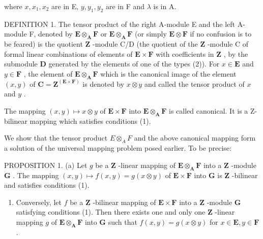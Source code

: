 where \(x, x_{1}, x_{2}\) are in E, \(y, y_{1}, y_{2}\) are in F and \(\lambda\) is in A.

DEFINITION 1. The tensor product of the right A-module E and the left A-module F, denoted by \(\mathbf{E} \otimes_{\mathbf{A}} \mathbf{F}\) or \(\mathbf{E} \otimes_{\mathbf{A}} \mathbf{F}\) (or simply \(\mathbf{E} \otimes \mathbf{F}\) if no confusion is to be feared) is the quotient \(\mathbf{Z}\) -module C/D (the quotient of the \(\mathbf{Z}\) -module C of formal linear combinations of elements of \(\mathbf{E} \times \mathbf{F}\) with coefficients in \(\mathbf{Z}\) , by the submodule \(\mathbf{D}\) generated by the elements of one of the types (2)). For \(x \in \mathbf{E}\) and \(y \in \mathbf{F}\) , the element of \(\mathbf{E} \otimes_{\mathbf{A}} \mathbf{F}\) which is the canonical image of the element \((x, y)\) of \(\mathbf{C} = \mathbf{Z}^{(\mathbf{E} \times \mathbf{F})}\) is denoted by \(x \otimes y\) and called the tensor product of \(x\) and \(y\) .

The mapping \((x,y)\mapsto x\otimes y\) of \(\mathbf{E}\times \mathbf{F}\) into \(\mathbf{E}\otimes_{\mathbf{A}}\mathbf{F}\) is called canonical. It is a Z-bilinear mapping which satisfies conditions (1).

We show that the tensor product \(E \otimes_{A} F\) and the above canonical mapping form a solution of the universal mapping problem posed earlier. To be precise:

PROPOSITION 1. (a) Let \(g\) be a \(\mathbf{Z}\) -linear mapping of \(\mathbf{E} \otimes_{\mathbf{A}} \mathbf{F}\) into a \(\mathbf{Z}\) -module \(\mathbf{G}\) . The mapping \((x, y) \mapsto f(x, y) = g(x \otimes y)\) of \(\mathbf{E} \times \mathbf{F}\) into \(\mathbf{G}\) is \(\mathbf{Z}\) -bilinear and satisfies conditions (1).

\begin{enumerate}
\def\labelenumi{(\alph{enumi})}
\setcounter{enumi}{1}
\tightlist
\item
  Conversely, let \(f\) be a \(\mathbf{Z}\) -bilinear mapping of \(\mathbf{E} \times \mathbf{F}\) into a \(\mathbf{Z}\) -module \(\mathbf{G}\) satisfying conditions (1). Then there exists one and only one \(\mathbf{Z}\) -linear mapping \(g\) of \(\mathbf{E} \otimes_{\mathbf{A}} \mathbf{F}\) into \(\mathbf{G}\) such that \(f(x,y) = g(x \otimes y)\) for \(x \in \mathbf{E}, y \in \mathbf{F}\) .
\end{enumerate}

